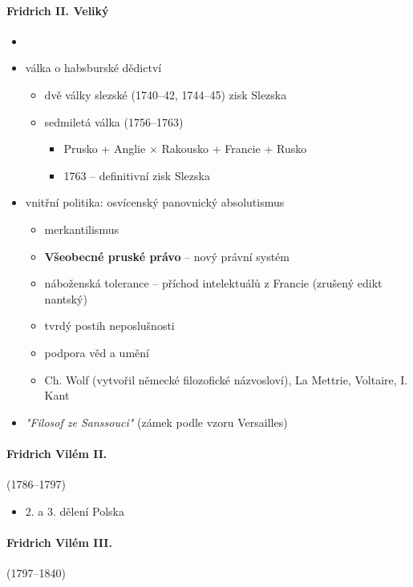 \paragraph{Fridrich II. Veliký}
\begin{itemize}
\item {}
\item válka o habsburské dědictví
	\begin{itemize}
	\item dvě války slezské (1740--42, 1744--45) \ra zisk Slezska
	\item sedmiletá válka (1756--1763)
		\begin{itemize}
		\item Prusko + Anglie $\times$ Rakousko + Francie + Rusko
		\item 1763 -- definitivní zisk Slezska
		\end{itemize}
	\end{itemize}
\item vnitřní politika: osvícenský panovnický absolutismus
	\begin{itemize}
	\item merkantilismus
	\item \textbf{Všeobecné pruské právo} -- nový právní systém
	\item náboženská tolerance -- příchod intelektuálů z Francie (zrušený edikt nantský)
	\item tvrdý postih neposlušnosti
	\item podpora věd a umění
	\item Ch. Wolf (vytvořil německé filozofické názvosloví), La Mettrie, Voltaire, I. Kant
	\end{itemize}
\item \textit{"Filosof ze Sanssouci"} (zámek podle vzoru Versailles)
\end{itemize}

\paragraph{Fridrich Vilém II.}(1786--1797)
\begin{itemize}
\item 2. a 3. dělení Polska
\end{itemize}

\paragraph{Fridrich Vilém III.}(1797--1840)

